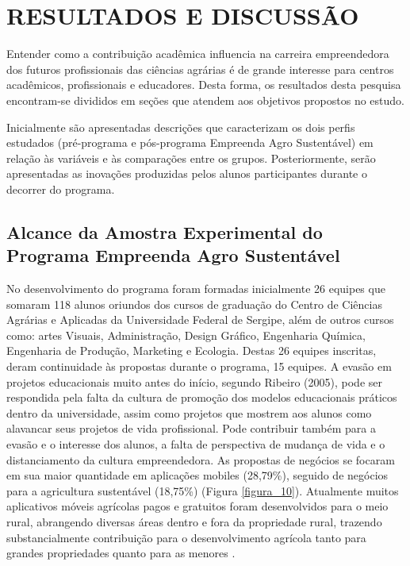 \chapter{RESULTADOS E DISCUSSÃO}

Entender como a contribuição acadêmica influencia na carreira empreendedora dos futuros profissionais das ciências agrárias é de grande interesse para centros acadêmicos, profissionais e educadores. Desta forma, os resultados desta pesquisa encontram-se divididos em seções que atendem aos objetivos propostos no estudo.

Inicialmente são apresentadas descrições que caracterizam os dois perfis estudados (pré-programa e pós-programa Empreenda Agro Sustentável) em relação às variáveis e às comparações entre os grupos. Posteriormente, serão apresentadas as inovações produzidas pelos alunos participantes durante o decorrer do programa.


\section{Alcance da Amostra Experimental do Programa Empreenda Agro Sustentável}

No desenvolvimento do programa foram formadas inicialmente 26 equipes que somaram 118 alunos oriundos dos cursos de graduação do Centro de Ciências Agrárias e Aplicadas da Universidade Federal de Sergipe, além de outros cursos como: artes Visuais, Administração, Design Gráfico, Engenharia Química, Engenharia de Produção, Marketing e Ecologia. Destas 26 equipes inscritas, deram continuidade às propostas durante o programa, 15 equipes. A evasão em projetos educacionais muito antes do início, segundo Ribeiro (2005), pode ser respondida pela falta da cultura de promoção dos modelos educacionais práticos dentro da universidade, assim como projetos que mostrem aos alunos como alavancar seus projetos de vida profissional. Pode contribuir também para a evasão e o interesse dos alunos, a falta de perspectiva de mudança de vida e o distanciamento da cultura empreendedora.
As propostas de negócios se focaram em sua maior quantidade em aplicações mobiles (28,79\%), seguido de negócios para a agricultura sustentável (18,75\%) (Figura \ref{figura_10}). Atualmente muitos aplicativos móveis agrícolas pagos e gratuitos foram desenvolvidos para o meio rural, abrangendo diversas áreas dentro e fora da propriedade rural, trazendo substancialmente contribuição para o desenvolvimento agrícola tanto para grandes propriedades quanto para as menores \cite{silva_caracterizacao_2017}. 
 
